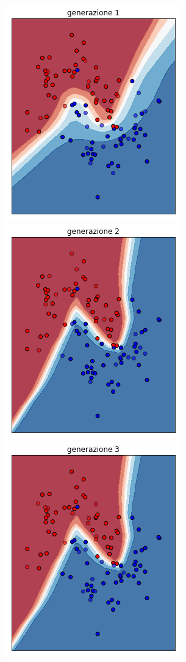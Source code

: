 \documentclass[12pt,a4paper]{report}
\begin{document}
\begin{figure}[H]
 \centering
 \includegraphics[scale = 0.35]{images/moons-rnd-log./1}
 \includegraphics[scale = 0.35]{images/moons-rnd-log./2}
 \includegraphics[scale = 0.35]{images/moons-rnd-log./3}

\end{figure}
\end{document}
